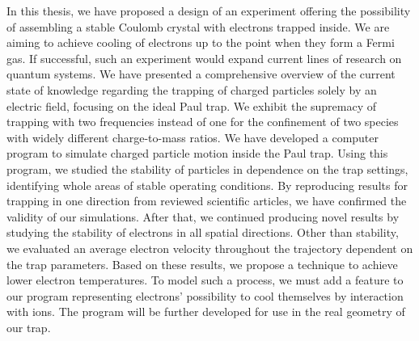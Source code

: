 

In this thesis, we have proposed a design of an experiment offering the possibility of assembling a stable Coulomb crystal with electrons trapped inside. We are aiming to achieve cooling of electrons up to the point when they form a Fermi gas. If successful, such an experiment would expand current lines of research on quantum systems. We have presented a comprehensive overview of the current state of knowledge regarding the trapping of charged particles solely by an electric field, focusing on the ideal Paul trap. We exhibit the supremacy of trapping with two frequencies instead of one for the confinement of two species with widely different charge-to-mass ratios. We have developed a computer program to simulate charged particle motion inside the Paul trap. Using this program, we studied the stability of particles in dependence on the trap settings, identifying whole areas of stable operating conditions. By reproducing results for trapping in one direction from reviewed scientific articles, we have confirmed the validity of our simulations. After that, we continued producing novel results by studying the stability of electrons in all spatial directions. Other than stability, we evaluated an average electron velocity throughout the trajectory dependent on the trap parameters. Based on these results, we propose a technique to achieve lower electron temperatures. To model such a process, we must add a feature to our program representing electrons' possibility to cool themselves by interaction with ions. The program will be further developed for use in the real geometry of our trap. 
